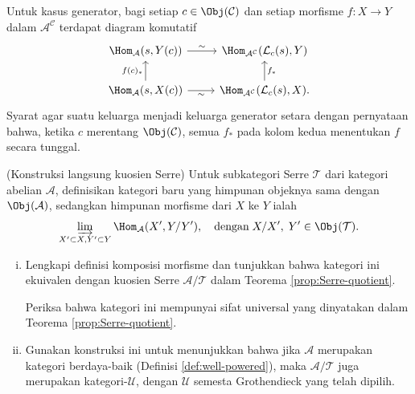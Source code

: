 \begin{Exercises}
	\begin{hint}
		Untuk kasus generator, bagi setiap $c\in\Obj(\mathcal{C})$ dan setiap
		morfisme $f:X\to Y$ dalam $\mathcal{A}^{\mathcal{C}}$ terdapat diagram
		komutatif
		\[\begin{tikzcd}
			\Hom_{\mathcal{A}}(s, Y(c)) \arrow[r, "\sim"] & \Hom_{\mathcal{A}^{\mathcal{C}}}(\mathcal{L}_c(s), Y) \\
			\Hom_{\mathcal{A}}(s, X(c)) \arrow[r, "\sim"'] \arrow[u, "{f(c)_*}"] & \Hom_{\mathcal{A}^{\mathcal{C}}}(\mathcal{L}_c(s), X) \arrow[u, "{f_*}"'] .
		\end{tikzcd}\]
		Syarat agar suatu keluarga menjadi keluarga generator setara dengan
		pernyataan bahwa, ketika
		$c$ merentang $\Obj(\mathcal{C})$, semua $f_*$ pada kolom kedua
		menentukan $f$ secara tunggal.
	\end{hint}

	\item (Konstruksi langsung kuosien Serre) Untuk subkategori Serre
	$\mathcal{T}$ dari kategori abelian $\mathcal{A}$, definisikan kategori baru
	yang himpunan objeknya sama dengan $\Obj(\mathcal{A})$, sedangkan himpunan
	morfisme dari $X$ ke $Y$ ialah
	\[ \varinjlim_{X' \subset X, Y' \subset Y} \Hom_{\mathcal{A}}(X', Y/Y'),
	\quad \text{dengan}\; X/X',\;Y'\in\Obj(\mathcal{T}). \]
	\begin{enumerate}[(i)]
		\item Lengkapi definisi komposisi morfisme dan tunjukkan bahwa kategori ini
		ekuivalen dengan kuosien Serre $\mathcal{A}/\mathcal{T}$ dalam Teorema
		\ref{prop:Serre-quotient}.
		\begin{hint}
			Periksa bahwa kategori ini mempunyai sifat universal yang
			dinyatakan dalam Teorema \ref{prop:Serre-quotient}.
		\end{hint}
		\item Gunakan konstruksi ini untuk menunjukkan bahwa jika $\mathcal{A}$
		merupakan kategori berdaya-baik (Definisi \ref{def:well-powered}), maka
		$\mathcal{A}/\mathcal{T}$ juga merupakan kategori-$\mathcal{U}$, dengan
		$\mathcal{U}$ semesta Grothendieck yang telah dipilih.
	\end{enumerate}


\end{Exercises}
